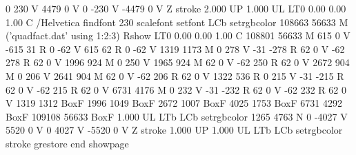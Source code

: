 0 230 V
4479 0 V
0 -230 V
-4479 0 V
Z stroke
2.000 UP
1.000 UL
LT0
0.00 0.00 1.00 C /Helvetica findfont 230 scalefont setfont
LCb setrgbcolor
108663 56633 M
('quadfact.dat' using 1:2:3) Rshow
LT0
0.00 0.00 1.00 C 108801 56633 M
615 0 V
-615 31 R
0 -62 V
615 62 R
0 -62 V
1319 1173 M
0 278 V
-31 -278 R
62 0 V
-62 278 R
62 0 V
1996 924 M
0 250 V
1965 924 M
62 0 V
-62 250 R
62 0 V
2672 904 M
0 206 V
2641 904 M
62 0 V
-62 206 R
62 0 V
1322 536 R
0 215 V
-31 -215 R
62 0 V
-62 215 R
62 0 V
6731 4176 M
0 232 V
-31 -232 R
62 0 V
-62 232 R
62 0 V
1319 1312 BoxF
1996 1049 BoxF
2672 1007 BoxF
4025 1753 BoxF
6731 4292 BoxF
109108 56633 BoxF
1.000 UL
LTb
LCb setrgbcolor
1265 4763 N
0 -4027 V
5520 0 V
0 4027 V
-5520 0 V
Z stroke
1.000 UP
1.000 UL
LTb
LCb setrgbcolor
stroke
grestore
end
showpage
